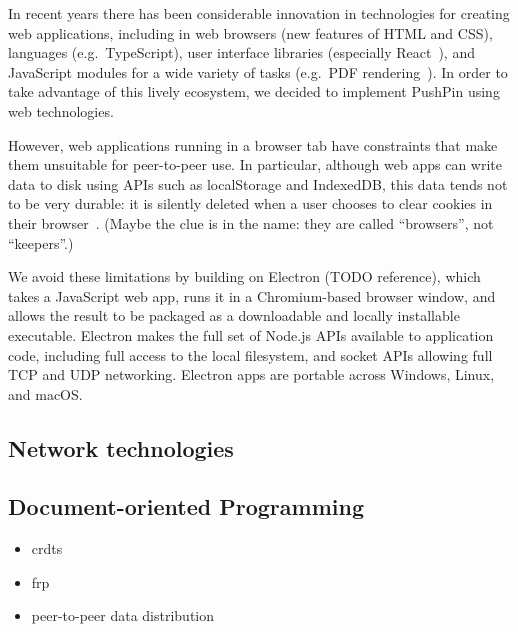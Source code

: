 \documentclass[sigplan,10pt]{acmart}
\begin{document}
In recent years there has been considerable innovation in technologies for creating web applications, including in web browsers (new features of HTML and CSS), languages (e.g.\ TypeScript), user interface libraries (especially React~\cite{React}), and JavaScript modules for a wide variety of tasks (e.g.\ PDF rendering~\cite{PDFjs}).
In order to take advantage of this lively ecosystem, we decided to implement PushPin using web technologies.

However, web applications running in a browser tab have constraints that make them unsuitable for peer-to-peer use.
In particular, although web apps can write data to disk using APIs such as localStorage and IndexedDB, this data tends not to be very durable: it is silently deleted when a user chooses to clear cookies in their browser~\cite{LocalStorageCleared}.
(Maybe the clue is in the name: they are called ``browsers'', not ``keepers''.)

We avoid these limitations by building on Electron (TODO reference), which takes a JavaScript web app, runs it in a Chromium-based browser window, and allows the result to be packaged as a downloadable and locally installable executable.
Electron makes the full set of Node.js APIs available to application code, including full access to the local filesystem, and socket APIs allowing full TCP and UDP networking.
Electron apps are portable across Windows, Linux, and macOS.


\subsection{Network technologies}




\subsection{Document-oriented Programming}
\begin{itemize}
    \item crdts
    \item frp
    \item peer-to-peer data distribution
\end{itemize}
\end{document}
